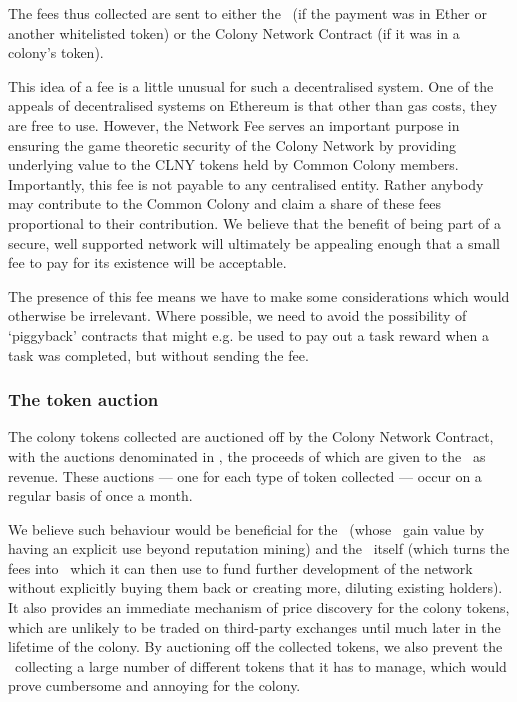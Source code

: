 The fees thus collected are sent to either the \rc\ (if the payment was in Ether or another whitelisted token) or the Colony Network Contract (if it was in a colony's token).

This idea of a fee is a little unusual for such a decentralised system. One of the appeals of decentralised systems on Ethereum is that other than gas costs, they are free to use. However, the Network Fee serves an important purpose in ensuring the game theoretic security of the Colony Network by providing underlying value to the CLNY tokens held by Common Colony members. Importantly, this fee is not payable to any centralised entity. Rather anybody may contribute to the Common Colony and claim a share of these fees proportional to their contribution. We believe that the benefit of being part of a secure, well supported network will ultimately be appealing enough that a small fee to pay for its existence will be acceptable.

The presence of this fee means we have to make some considerations which would otherwise be irrelevant. Where possible, we need to avoid the possibility of `piggyback' contracts that might e.g. be used to pay out a task reward when a task was completed, but without sending the fee. 

\subsubsection{The token auction}
The colony tokens collected are auctioned off by the Colony Network Contract, with the auctions denominated in \rcts, the proceeds of which are given to the \rc\ as revenue. These auctions --- one for each type of token collected --- occur on a regular basis of once a month.

We believe such behaviour would be beneficial for the \rcths\ (whose \rcts\ gain value by having an explicit use beyond reputation mining) and the \rc\ itself (which turns the fees into \rcts\ which it can then use to fund further development of the network without explicitly buying them back or creating more, diluting existing holders). It also provides an immediate mechanism of price discovery for the colony tokens, which are unlikely to be traded on third-party exchanges until much later in the lifetime of the colony. By auctioning off the collected tokens, we also prevent the \rc\ collecting a large number of different tokens that it has to manage, which would prove cumbersome and annoying for the colony.



